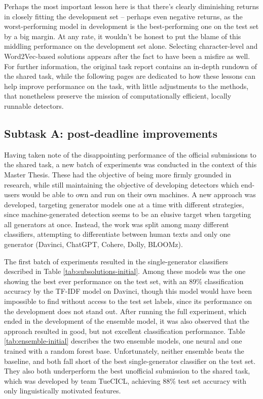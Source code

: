 Perhaps the most important lesson here is that there's clearly diminishing returns in closely fitting the development set -- perhaps even negative returns, as the worst-performing model in development is the best-performing one on the test set by a big margin.
At any rate, it wouldn't be honest to put the blame of this middling performance on the development set alone.
Selecting character-level and Word2Vec-based solutions appears after the fact to have been a misfire as well.
For further information, the original task report \citep{stuhlinger-winkler-2024-tuecicl} contains an in-depth rundown of the shared task, while the following pages are dedicated to how these lessons can help improve performance on the task, with little adjustments to the methods, that nonetheless preserve the mission of computationally efficient, locally runnable detectors.

\subsection{Subtask A: post-deadline improvements}

Having taken note of the disappointing performance of the official submissions to the shared task, a new batch of experiments was conducted in the context of this Master Thesis.
These had the objective of being more firmly grounded in research, while still maintaining the objective of developing detectors which end-users would be able to own and run on their own machines.
A new approach was developed, targeting generator models one at a time with different strategies, since machine-generated detection seems to be an elusive target when targeting all generators at once.
Instead, the work was split among many different classifiers, attempting to differentiate between human texts and only one generator (Davinci, ChatGPT, Cohere, Dolly, BLOOMz).

The first batch of experiments resulted in the single-generator classifiers described in Table \ref{tab:subsolutions-initial}.
Among these models was the one showing the best ever performance on the test set, with an 89\% classification accuracy by the TF-IDF model on Davinci, though this model would have been impossible to find without access to the test set labels, since its performance on the development does not stand out.
After running the full experiment, which ended in the development of the ensemble model, it was also observed that the approach resulted in good, but not excellent classification performance.
Table \ref{tab:ensemble-initial} describes the two ensemble models, one neural and one trained with a random forest base.
Unfortunately, neither ensemble beats the baseline, and both fall short of the best single-generator classifier on the test set.
They also both underperform the best unofficial submission to the shared task, which was developed by team TueCICL, achieving 88\% test set accuracy with only linguistically motivated features.

